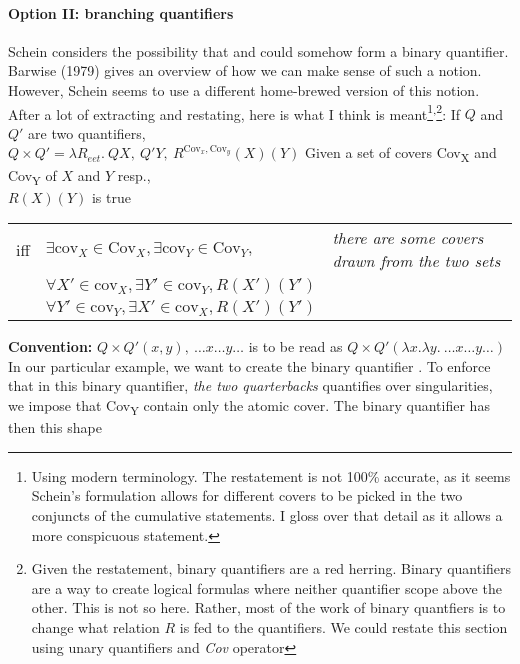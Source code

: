 \begin{nothing}
\paragraph{Option II: branching quantifiers} Schein considers the possibility that  and  could somehow form a binary quantifier. Barwise (1979) gives an overview of how we can make sense of such a notion. However, Schein seems to use a different home-brewed version of this notion. After a lot of extracting and restating, here is what I think is meant\footnote{Using modern terminology. The restatement is not 100\% accurate, as it seems Schein's formulation allows for different covers to be picked in the two conjuncts of the cumulative statements. I gloss over that detail as it allows a more conspicuous statement.}\textsuperscript{,}\footnote{Given the restatement, binary quantifiers are a red herring. Binary quantifiers are a way to create logical formulas where neither quantifier scope above the other. This is not so here. Rather, most of the work of binary quantfiers is to change what relation $R$ is fed to the quantifiers. We could restate this section using unary quantifiers and \emph{Cov} operator}:
\pex
\a 
If $Q$ and $Q'$ are two quantifiers,\\
$Q\times Q' = \lambda R_{eet}.\  Q X,\ Q' Y,\
R^{\text{Cov}_x,\text{Cov}_y}(X)(Y)
$
\a Given a set of covers Cov\textsubscript{X} and Cov\textsubscript{Y} of $X$ and $Y$ resp., \\
$R(X)(Y)$ is true \\
\setlength{\tabcolsep}{3pt}
\begin{tabular}{lll}%
iff& $\exists \text{cov}_X\in \text{Cov}_{X}, \exists \text{cov}_Y\in \text{Cov}_{Y},$& \emph{there are some covers drawn from the two sets}\\
&$\forall X'\in \text{cov}_{X}, \exists Y'\in \text{cov}_{Y}, R(X')(Y')$&\\
&$\forall Y'\in \text{cov}_{Y}, \exists X'\in \text{cov}_{X}, R(X')(Y')$&\\

\end{tabular}
\a \textbf{Convention:} $Q\times Q' (x,y),\ \ldots x \ldots y \ldots$ is to be read as $Q\times Q'\left( \lambda x. \lambda y.\ \ldots x \ldots y \ldots\right) $ 
\xe
%
In our particular example, we want to create the binary quantifier . To enforce that in this binary quantifier, \emph{the two quarterbacks} quantifies over singularities, we impose that Cov\textsubscript{Y} contain only the atomic cover. The binary quantifier has then this shape


\end{nothing}
